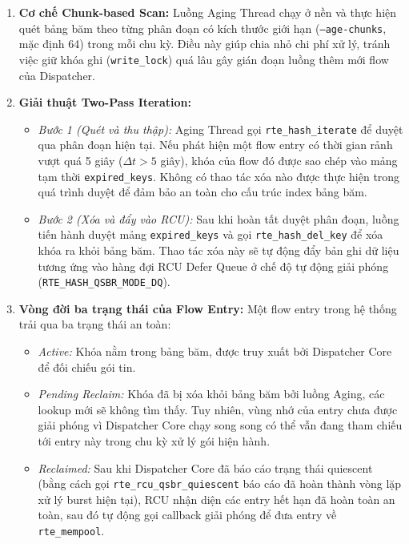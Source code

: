 \documentclass[12pt,a4paper,twoside]{report}
\begin{document}
\begin{enumerate}
    \item \textbf{Cơ chế Chunk-based Scan:} Luồng Aging Thread chạy ở nền và thực hiện quét bảng băm theo từng phân đoạn có kích thước giới hạn (\texttt{--age-chunks}, mặc định 64) trong mỗi chu kỳ. Điều này giúp chia nhỏ chi phí xử lý, tránh việc giữ khóa ghi (\texttt{write\_lock}) quá lâu gây gián đoạn luồng thêm mới flow của Dispatcher.
    \item \textbf{Giải thuật Two-Pass Iteration:}
    \begin{itemize}
        \item \textit{Bước 1 (Quét và thu thập):} Aging Thread gọi \texttt{rte\_hash\_iterate} để duyệt qua phân đoạn hiện tại. Nếu phát hiện một flow entry có thời gian rảnh vượt quá 5 giây ($\Delta t > 5$ giây), khóa của flow đó được sao chép vào mảng tạm thời \texttt{expired\_keys}. Không có thao tác xóa nào được thực hiện trong quá trình duyệt để đảm bảo an toàn cho cấu trúc index bảng băm.
        \item \textit{Bước 2 (Xóa và đẩy vào RCU):} Sau khi hoàn tất duyệt phân đoạn, luồng tiến hành duyệt mảng \texttt{expired\_keys} và gọi \texttt{rte\_hash\_del\_key} để xóa khóa ra khỏi bảng băm. Thao tác xóa này sẽ tự động đẩy bản ghi dữ liệu tương ứng vào hàng đợi RCU Defer Queue ở chế độ tự động giải phóng (\texttt{RTE\_HASH\_QSBR\_MODE\_DQ}).
    \end{itemize}
    \item \textbf{Vòng đời ba trạng thái của Flow Entry:}
    Một flow entry trong hệ thống trải qua ba trạng thái an toàn:
    \begin{itemize}
        \item \textit{Active:} Khóa nằm trong bảng băm, được truy xuất bởi Dispatcher Core để đối chiếu gói tin.
        \item \textit{Pending Reclaim:} Khóa đã bị xóa khỏi bảng băm bởi luồng Aging, các lookup mới sẽ không tìm thấy. Tuy nhiên, vùng nhớ của entry chưa được giải phóng vì Dispatcher Core chạy song song có thể vẫn đang tham chiếu tới entry này trong chu kỳ xử lý gói hiện hành.
        \item \textit{Reclaimed:} Sau khi Dispatcher Core đã báo cáo trạng thái quiescent (bằng cách gọi \texttt{rte\_rcu\_qsbr\_quiescent} báo cáo đã hoàn thành vòng lặp xử lý burst hiện tại), RCU nhận diện các entry hết hạn đã hoàn toàn an toàn, sau đó tự động gọi callback giải phóng để đưa entry về \texttt{rte\_mempool}.
    \end{itemize}
\end{enumerate}
\end{document}
